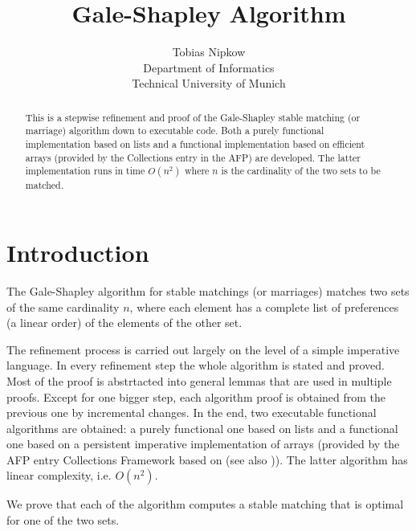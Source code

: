 \documentclass[11pt,a4paper]{article}
\begin{document}
\title{Gale-Shapley Algorithm}
\author{Tobias Nipkow\\Department of Informatics\\Technical University of Munich}
\maketitle

\begin{abstract}
  This is a stepwise refinement and proof of the Gale-Shapley stable
  matching (or marriage) algorithm down to executable code. Both a
  purely functional implementation based on lists and a
  functional implementation based on efficient arrays (provided
  by the Collections entry in the AFP) are developed.  The latter
  implementation runs in time $O(n^2)$ where $n$ is the cardinality of
  the two sets to be matched.
\end{abstract}

\section{Introduction}

The Gale-Shapley algorithm \cite{GaleS62,GusfieldI89} for stable
matchings (or marriages) matches two sets of the same cardinality $n$,
where each element has a complete list of preferences (a linear order)
of the elements of the other set.

The refinement process is carried out largely on the level of a simple
imperative language. In every refinement step the whole algorithm is
stated and proved. Most of the proof is abstrtacted into general
lemmas that are used in multiple proofs. Except for one bigger step,
each algorithm proof is obtained from the previous one by incremental changes.
In the end, two executable functional algorithms are obtained:
a purely functional one based on lists and a functional one based on a
persistent imperative implementation of arrays (provided by the AFP entry
Collections Framework \cite{Collections-AFP} based on \cite{Baker91}
(see also \cite{ConchonF07})).
The latter algorithm has linear complexity, i.e. $O(n^2)$.

We prove that each of the algorithm computes a stable matching that is
optimal for one of the two sets.

\newpage





\end{document}
